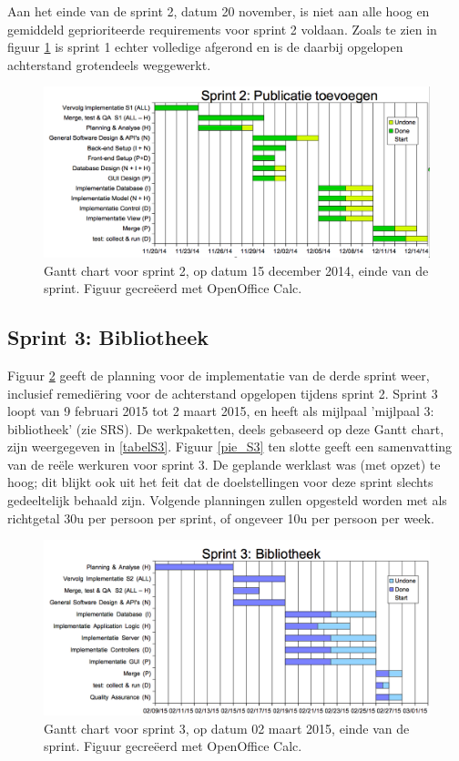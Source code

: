 \documentclass{article}
\begin{document}
\noindent Aan het einde van de sprint 2, datum 20 november, is niet aan alle hoog en gemiddeld geprioriteerde requirements voor sprint 2 voldaan. Zoals te zien in figuur \ref{gantt_S2_15dec} is sprint 1 echter volledige afgerond en is de daarbij opgelopen achterstand grotendeels weggewerkt. 

\begin{figure}[h!]
\centering
 \includegraphics[scale=0.4]{Gantt_S2_15dec.png}
 \caption{Gantt chart voor sprint 2, op datum 15 december 2014, einde van de sprint. Figuur gecre\"{e}erd met OpenOffice Calc.}
 \label{gantt_S2_15dec}
\end{figure}

\clearpage
\subsection{Sprint 3:  Bibliotheek}

Figuur \ref{gantt_S3_2maart} geeft de planning voor de implementatie van de derde sprint weer, inclusief remedi\"{e}ring voor de achterstand opgelopen tijdens sprint 2. Sprint 3 loopt van 9 februari 2015  tot 2 maart 2015, en heeft als mijlpaal 'mijlpaal 3: bibliotheek' (zie SRS). De werkpaketten, deels gebaseerd op deze Gantt chart, zijn weergegeven in \ref{tabelS3}. Figuur \ref{pie_S3} ten slotte geeft een samenvatting van de re\"{e}le werkuren voor sprint 3. De geplande werklast was (met opzet) te hoog; dit blijkt ook uit het feit dat de doelstellingen voor deze sprint slechts gedeeltelijk behaald zijn. Volgende planningen zullen opgesteld worden met als richtgetal 30u per persoon per sprint, of ongeveer 10u per persoon per week. 

\begin{figure}[h!]
\centering
 \includegraphics[scale=0.4]{Gantt_S3_2maart.png}
 \caption{Gantt chart voor sprint 3, op datum 02 maart 2015, einde van de sprint. Figuur gecre\"{e}erd met OpenOffice Calc.}
 \label{gantt_S3_2maart}
\end{figure}
\end{document}
